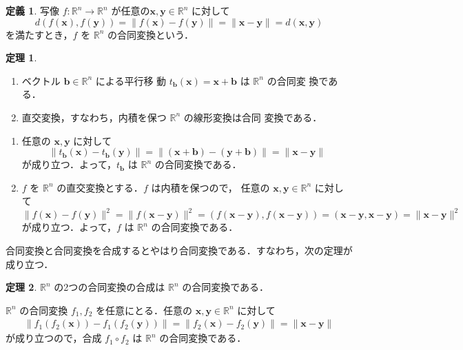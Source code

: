 \documentclass[11pt, uplatex, dvipdfmx, titlepage]{jsarticle}
\makeatletter
\renewenvironment{proof}[1][\proofname]{\par
  \pushQED{\qed}%
  \normalfont \topsep6\p@\@plus6\p@\relax
  \trivlist
  \item[\hskip\labelsep
         \bfseries
    {#1}]\ignorespaces
}{%
  \popQED\endtrivlist\@endpefalse
}
\theoremstyle{definition}
\newtheorem{theorem}{定理}[section]
\newtheorem*{definition}{定義}
\renewcommand{\proofname}{\textbf{証明}}
\makeatother
\begin{document}
\begin{definition}
  写像 $f:\mathbb{R}^n \to \mathbb{R}^n$
  が任意の$\bm{x}, \bm{y} \in \mathbb{R}^n$ に対して
  \[
    d(f(\bm{x}), f(\bm{y})) = \|f(\bm{x}) - f(\bm{y})\| = \|\bm{x} - \bm{y}\| = d(\bm{x}, \bm{y})
  \]
  を満たすとき，$f$ を $\mathbb{R}^n$ の合同変換という．
\end{definition}

\begin{theorem}\label{thm:trans-orth}
  \begin{enumerate}[(1)]
  \item ベクトル $\bm{b} \in \mathbb{R}^n$ による平行移
    動 $t_{\bm{b}}(\bm{x}) = \bm{x} + \bm{b}$ は $\mathbb{R}^n$ の合同変
    換である．
  \item 直交変換，すなわち，内積を保つ $\mathbb{R}^n$ の線形変換は合同
    変換である．
  \end{enumerate}
    \begin{proof}
      \begin{enumerate}[(1)]
      \item 任意の $\bm{x}, \bm{y}$ に対して
      \[
        \|t_{\bm{b}}(\bm{x}) - t_{\bm{b}}(\bm{y})\| =\|(\bm{x}+\bm{b}) -
        (\bm{y}+\bm{b})\| = \|\bm{x}-\bm{y}\|
      \]
      が成り立つ．よって，$t_{\bm{b}}$ は $\mathbb{R}^n$ の合同変換である．
      
    \item $f$ を $\mathbb{R}^n$ の直交変換とする．$f$ は内積を保つので，
      任意の $\bm{x}, \bm{y} \in \mathbb{R}^n$ に対して
      \[
        \|f(\bm{x}) - f(\bm{y})\|^2 = \|f(\bm{x}-\bm{y})\|^2 = \left( f(\bm{x}-\bm{y}), f(\bm{x}-\bm{y})\right)
        = (\bm{x}-\bm{y}, \bm{x}-\bm{y}) = \|\bm{x}-\bm{y}\|^2
      \]
      が成り立つ．よって，$f$ は $\mathbb{R}^n$ の合同変換である．
    \end{enumerate}
  \end{proof}
\end{theorem}

合同変換と合同変換を合成するとやはり合同変換である．すなわち，次の定理が成り立つ．

\begin{theorem}\label{thm:comp_isom}
  $\mathbb{R}^n$ の2つの合同変換の合成は $\mathbb{R}^n$ の合同変換である．
\end{theorem}

\begin{proof}
  $\mathbb{R}^n$ の合同変換 $f_1, f_2$ を任意にとる．任意の $\bm{x}, \bm{y} \in \mathbb{R}^n$ に対して
  \begin{align*}
    \|f_1 \left(f_2 \left(\bm{x}\right)\right)-f_1 \left(f_2\left(\bm{y}\right)\right)\|
    = \| f_2(\bm{x})- f_2(\bm{y}) \| = \|\bm{x}- \bm{y}\|
  \end{align*}
  が成り立つので，合成 $f_1 \circ f_2$ は $\mathbb{R}^n$ の合同変換である．
\end{proof}
\end{document}
